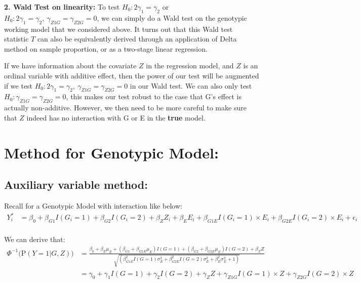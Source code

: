\documentclass[
]{article}
\begin{document}
\textbf{2. Wald Test on linearity:} To test
\(H_0: 2\gamma_1 = \gamma_2\) or
\(H_0: 2\gamma_1 = \gamma_2, \ \gamma_{Z1G}=\gamma_{Z2G} =0\), we can
simply do a Wald test on the genotypic working model that we considered
above. It turns out that this Wald test statistic \(T\) can also be
equivalently derived through an application of Delta method on sample
proportion, or as a two-stage linear regression.

If we have information about the covariate \(Z\) in the regression
model, and \(Z\) is an ordinal variable with additive effect, then the
power of our test will be augmented if we test
\(H_0: 2\gamma_1 = \gamma_2, \ \gamma_{Z1G}=\gamma_{Z2G} =0\) in our
Wald test. We can also only test \(H_0: \gamma_{Z1G}=\gamma_{Z2G} =0\),
this makes our test robust to the case that G's effect is actually
non-additive. However, we then need to be more careful to make sure that
\(Z\) indeed has no interaction with G or E in the \textbf{true} model.

\hypertarget{method-for-genotypic-model}{%
\section{Method for Genotypic Model:}\label{method-for-genotypic-model}}

\hypertarget{auxiliary-variable-method}{%
\subsection{Auxiliary variable
method:}\label{auxiliary-variable-method}}

Recall for a Genotypic Model with interaction like below:
\begin{equation}\label{eqn:genointer}
\begin{aligned}
Y_i^* &= \beta_0 + \beta_{G1} I(G_i = 1) + \beta_{G2} I(G_i = 2) + \beta_Z Z_i + \beta_E E_i + \beta_{G1E} I(G_i = 1) \times E_i + \beta_{G2E} I(G_i = 2) \times E_i  + \epsilon_i \\
\end{aligned}
\end{equation}

We can derive that: \begin{equation}\label{eqn:RStest}
\begin{aligned}
\Phi^{-1} \bigg(\text{P}(Y = 1 | G, Z) \bigg) &= \frac{\beta_0+\beta_E \mu_E+(\beta_{G1} + \beta_{G1E} \mu_E)I(G = 1)+(\beta_{G2} + \beta_{G2E} \mu_E)I(G = 2) + \beta_Z Z}{\sqrt{(\beta_{G1E}^2 I(G = 1) \sigma_E^2 +\beta_{G2E}^2 I(G = 2) \sigma_E^2 + \beta_E^2 \sigma_E^2 + 1)}} \\
&= \gamma_0 + \gamma_1 I(G = 1) + \gamma_2 I(G = 2) + \gamma_Z Z + \gamma_{Z1G} I(G = 1) \times Z + \gamma_{Z2G} I(G = 2) \times Z
\end{aligned}
\end{equation}
\end{document}
